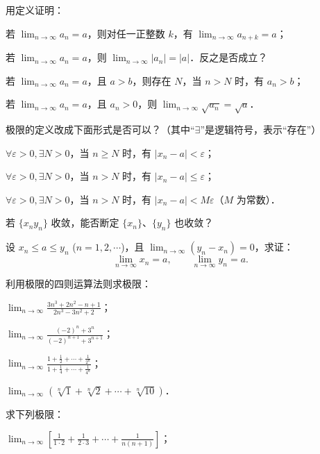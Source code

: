 \begin{xiti}
\begin{ziti}
  \end{ziti}
\item 用定义证明：
  \begin{ziti}
  \item 若 $\lim_{n\to\infty}a_n = a$，则对任一正整数 $k$，有 $\lim_{n\to\infty}a_{n+k} = a$；
  \item 若 $\lim_{n\to\infty}a_n = a$，则 $\lim_{n\to\infty}|a_n| = |a|$．反之是否成立？
  \item 若 $\lim_{n\to\infty}a_n = a$，且 $a>b$，则存在 $N$，当 $n>N$ 时，有 $a_n > b$；
  \item 若 $\lim_{n\to\infty}a_n = a$，且 $a_n > 0$，则 $\lim_{n\to\infty}\sqrt{a_n} = \sqrt{a}$．
  \end{ziti}
\item 极限的定义改成下面形式是否可以？（其中``$\exists$''是逻辑符号，表示``存在''）
  \begin{ziti}
  \item $\forall \varepsilon > 0, \exists N > 0$，当 $n \geqslant N$ 时，有 $|x_n - a| < \varepsilon$；
  \item $\forall \varepsilon > 0, \exists N > 0$，当 $n > N$ 时，有 $|x_n - a| \leqslant \varepsilon$；
  \item $\forall \varepsilon > 0, \exists N > 0$，当 $n > N$ 时，有 $|x_n - a| < M\varepsilon$（$M$ 为常数）．
  \end{ziti}
\item 若 $\{x_n y_n\}$ 收敛，能否断定 $\{x_n\}$、$\{y_n\}$ 也收敛？
\item 设 $x_n \leqslant a \leqslant y_n$ ($n = 1, 2, \cdots$)，且 $\lim_{n \to \infty} (y_n - x_n) = 0$，求证：
\[
\lim_{n\to\infty}x_n = a,\qquad \lim_{n\to\infty}y_n = a.
\]
\item 利用极限的四则运算法则求极限：
  \begin{ziti}
  \item $\lim_{n \to \infty} \frac{3n^3 + 2n^2 - n + 1}{2n^3 - 3n^2 + 2}$；
  \item $\lim_{n\to\infty}\frac{(-2)^n + 3^n}{(-2)^{n+1} + 3^{n+1}}$；
  \item $\lim_{n \to \infty} \frac{1 + \frac{1}{2} + \cdots + \frac{1}{2^n}}{1 + \frac{1}{4} + \cdots + \frac{1}{4^n}}$；
  \item $\lim_{n \to \infty} (\sqrt[n]{1} + \sqrt[n]{2} + \cdots + \sqrt[n]{10})$．
  \end{ziti}
\item 求下列极限：
  \begin{ziti}
  \item $\lim_{n \to \infty} \left[\frac{1}{1 \cdot 2} + \frac{1}{2 \cdot 3} + \cdots + \frac{1}{n(n+1)}\right]$；

\end{ziti}
\end{xiti}
